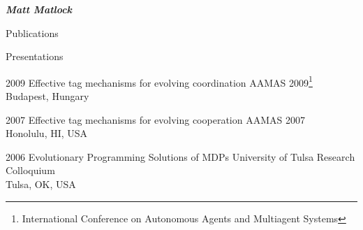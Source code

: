 \documentclass[10pt]{article}
\makeatletter
\newcommand\footnoteref[1]{\protected@xdef\@thefnmark{\ref{#1}}\@footnotemark}
\makeatother
\begin{document}
\begin{cv}{\huge \it \bfseries Matt Matlock}
\begin{cvlist}{Publications}
\end{cvlist}

\settowidth{\cvlabelwidth}{\cvlabelfont 2009-2009}%
\setlength{\cvlabelsep}{1em}

\pagebreak[2]
\begin{cvlist}{Presentations}
\item[2009] Effective tag mechanisms for evolving coordination \hfill AAMAS 2009\footnote{\label{AAMASfoot}International Conference on Autonomous Agents and Multiagent Systems} \\ \hspace*{\fill} Budapest, Hungary
\item[2007] Effective tag mechanisms for evolving cooperation \hfill AAMAS 2007\footnoteref{AAMASfoot} \\ \hspace*{\fill} Honolulu, HI, USA
\item[2006] Evolutionary Programming Solutions of MDPs \hfill {University of Tulsa Research Colloquium} \\ \hspace*{\fill} Tulsa, OK, USA
\end{cvlist}


\end{cv}
\end{document}
